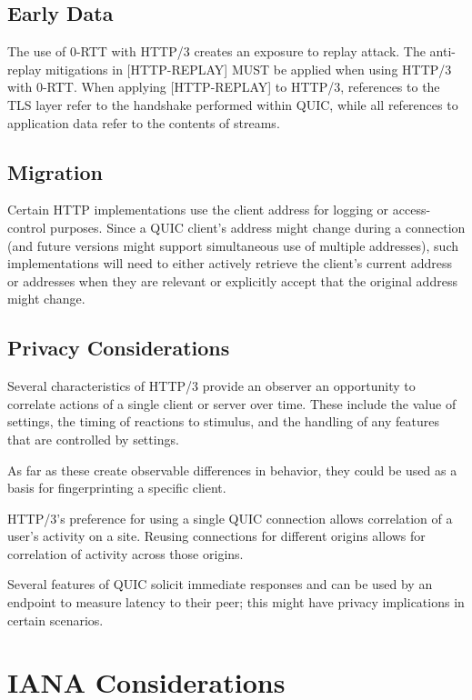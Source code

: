 \documentclass{article}
\begin{document}
\subsection{Early Data}

The use of 0-RTT with HTTP/3 creates an exposure to replay attack. The anti-replay mitigations in [HTTP-REPLAY] MUST be applied when using HTTP/3 with 0-RTT.  When applying [HTTP-REPLAY] to HTTP/3, references to the TLS layer refer to the handshake performed within QUIC, while all references to application data refer to the contents of streams.

\subsection{Migration}

Certain HTTP implementations use the client address for logging or access-control purposes.  Since a QUIC client's address might change during a connection (and future versions might support simultaneous use of multiple addresses), such implementations will need to either actively retrieve the client's current address or addresses when they are relevant or explicitly accept that the original address might change.

\subsection{Privacy Considerations}

Several characteristics of HTTP/3 provide an observer an opportunity to correlate actions of a single client or server over time.  These include the value of settings, the timing of reactions to stimulus, and the handling of any features that are controlled by settings.

As far as these create observable differences in behavior, they could be used as a basis for fingerprinting a specific client.

HTTP/3's preference for using a single QUIC connection allows correlation of a user's activity on a site.  Reusing connections for different origins allows for correlation of activity across those origins.

Several features of QUIC solicit immediate responses and can be used by an endpoint to measure latency to their peer; this might have privacy implications in certain scenarios.

\section{IANA Considerations}
\end{document}
